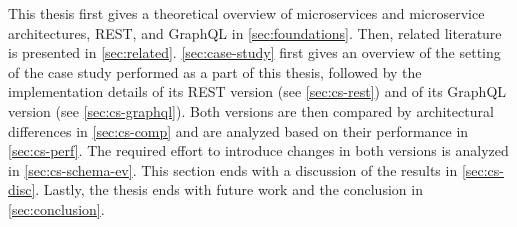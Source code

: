 
This thesis first gives a theoretical overview of microservices and microservice architectures, \ac{REST}, and GraphQL in \autoref{sec:foundations}.
Then, related literature is presented in \autoref{sec:related}.
\autoref{sec:case-study} first gives an overview of the setting of the case study performed as a part of this thesis, followed by the implementation details of its \ac{REST} version (see \autoref{sec:cs-rest}) and of its GraphQL version (see \autoref{sec:cs-graphql}).
Both versions are then compared by architectural differences in \autoref{sec:cs-comp} and are analyzed based on their performance in \autoref{sec:cs-perf}.
The required effort to introduce changes in both versions is analyzed in \autoref{sec:cs-schema-ev}.
This section ends with a discussion of the results in \autoref{sec:cs-disc}.
Lastly, the thesis ends with future work and the conclusion in \autoref{sec:conclusion}.
